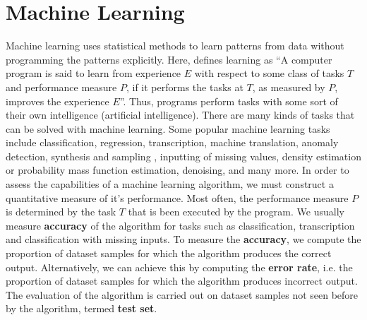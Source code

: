 \documentclass[master]{thesis-uestc}
\begin{document}
\section{Machine Learning}
Machine learning uses statistical methods to learn patterns from data without programming the patterns explicitly. Here, \cite{mitchell1997} defines learning as ``A computer program is said to learn from experience $E$ with respect to some class of tasks $T$ and performance measure $P$, if it performs the tasks at $T$, as measured by $P$, improves the experience $E$''. Thus, programs perform tasks with some sort of their own intelligence (artificial intelligence). There are many kinds of tasks that can be solved with machine learning. Some popular machine learning tasks include classification\cite{Goodfellow-et-al-2016}, regression, transcription\cite{Goodfellow-et-al-2016}, machine translation\cite{DBLP:journals/corr/AbadiABBCCCDDDG16}\cite{DBLP:journals/corr/BahdanauCB14}, anomaly detection\cite{Chandola:2009:ADS:1541880.1541882}, synthesis and sampling \cite{pmlr-v31-luo13a}, inputting of missing values, density estimation or probability mass function estimation, denoising, and many more. In order to assess the capabilities of a machine learning algorithm, we must construct a quantitative measure of it's performance. Most often, the performance measure $P$ is determined by the task $T$ that is been executed by the program. We usually measure \textbf{accuracy} of the algorithm for tasks such as classification, transcription and classification with missing inputs. To measure the \textbf{accuracy}, we compute the proportion of dataset samples for which the algorithm produces the correct output. Alternatively, we can achieve this by computing the \textbf{error rate}, i.e. the proportion of dataset samples for which the algorithm produces incorrect output. The evaluation of the algorithm is carried out on dataset samples not seen before by the algorithm, termed \textbf{test set}.
\end{document}
